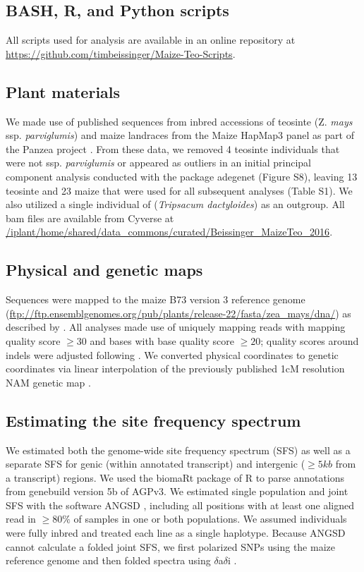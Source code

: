 \documentclass[12pt,a4paper]{article}
\begin{document}
\subsection*{BASH, R, and Python scripts}
All scripts used for analysis are available in an online repository at \url{https://github.com/timbeissinger/Maize-Teo-Scripts}. 

\subsection*{Plant materials}
We made use of published sequences from inbred accessions of teosinte (Z. {\it mays} ssp. {\it parviglumis}) and maize landraces from the Maize HapMap3 panel as part of the Panzea project  \cite{chia2012, lemmon2014, bukowski2015}. 
From these data, we removed 4 teosinte individuals that were not ssp. \textit{parviglumis} or appeared as outliers in an initial principal component analysis conducted with the package adegenet \cite{jombart2011} (Figure S8), leaving 13 teosinte and 23 maize that were used for all subsequent analyses (Table S1). We also utilized a single individual of (\textit{Tripsacum dactyloides}) as an outgroup.  All bam files are available from Cyverse at \url{/iplant/home/shared/data_commons/curated/Beissinger_MaizeTeo_2016}. 

\subsection*{Physical and genetic maps}
Sequences were mapped to the maize B73 version 3 reference genome \cite{schnable2009} (\url{ftp://ftp.ensemblgenomes.org/pub/plants/release-22/fasta/zea\_mays/dna/}) as described by \cite{bukowski2015}. 
All analyses made use of uniquely mapping reads with mapping quality score $\geq  30$ and bases with base quality score $\geq 20$; quality scores around indels were adjusted following \cite{li2011statistical}.
We converted physical coordinates to genetic coordinates via linear interpolation of the previously published 1cM resolution NAM genetic map \cite{glaubitz2014}. 

\subsection*{Estimating the site frequency spectrum}
We estimated both the genome-wide site frequency spectrum (SFS) as well as a separate SFS for genic (within annotated transcript) and intergenic ($\geq 5kb$ from a transcript) regions. 
We used the biomaRt package \cite{durinck2009,durinck2005} of R \cite{R2014} to parse annotations from genebuild version 5b of AGPv3. 
We estimated single population and joint SFS with the software ANGSD \cite{korneliussen2014}, including all positions with at least one aligned read in $\geq 80\%$ of samples in one or both populations.
We assumed individuals were fully inbred and treated each line as a single haplotype. Because ANGSD cannot calculate a folded joint SFS, we first polarized SNPs using the maize reference genome and then folded spectra using $\delta$a$\delta$i \cite{gutenkunst2009}.
\end{document}
